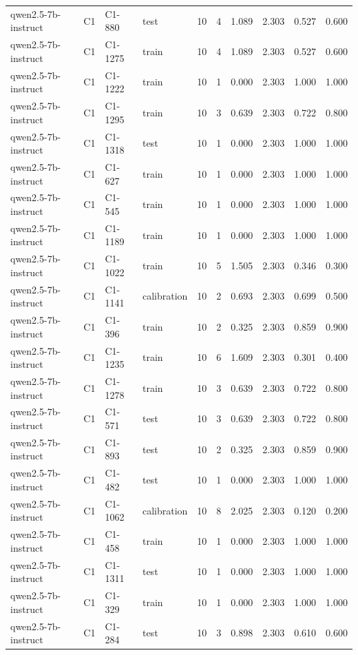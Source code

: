 \begin{table}
\begin{tabular}{llllrrrrrr}
qwen2.5-7b-instruct & C1 & C1-880 & test & 10 & 4 & 1.089 & 2.303 & 0.527 & 0.600 \\
qwen2.5-7b-instruct & C1 & C1-1275 & train & 10 & 4 & 1.089 & 2.303 & 0.527 & 0.600 \\
qwen2.5-7b-instruct & C1 & C1-1222 & train & 10 & 1 & 0.000 & 2.303 & 1.000 & 1.000 \\
qwen2.5-7b-instruct & C1 & C1-1295 & train & 10 & 3 & 0.639 & 2.303 & 0.722 & 0.800 \\
qwen2.5-7b-instruct & C1 & C1-1318 & test & 10 & 1 & 0.000 & 2.303 & 1.000 & 1.000 \\
qwen2.5-7b-instruct & C1 & C1-627 & train & 10 & 1 & 0.000 & 2.303 & 1.000 & 1.000 \\
qwen2.5-7b-instruct & C1 & C1-545 & train & 10 & 1 & 0.000 & 2.303 & 1.000 & 1.000 \\
qwen2.5-7b-instruct & C1 & C1-1189 & train & 10 & 1 & 0.000 & 2.303 & 1.000 & 1.000 \\
qwen2.5-7b-instruct & C1 & C1-1022 & train & 10 & 5 & 1.505 & 2.303 & 0.346 & 0.300 \\
qwen2.5-7b-instruct & C1 & C1-1141 & calibration & 10 & 2 & 0.693 & 2.303 & 0.699 & 0.500 \\
qwen2.5-7b-instruct & C1 & C1-396 & train & 10 & 2 & 0.325 & 2.303 & 0.859 & 0.900 \\
qwen2.5-7b-instruct & C1 & C1-1235 & train & 10 & 6 & 1.609 & 2.303 & 0.301 & 0.400 \\
qwen2.5-7b-instruct & C1 & C1-1278 & train & 10 & 3 & 0.639 & 2.303 & 0.722 & 0.800 \\
qwen2.5-7b-instruct & C1 & C1-571 & test & 10 & 3 & 0.639 & 2.303 & 0.722 & 0.800 \\
qwen2.5-7b-instruct & C1 & C1-893 & test & 10 & 2 & 0.325 & 2.303 & 0.859 & 0.900 \\
qwen2.5-7b-instruct & C1 & C1-482 & test & 10 & 1 & 0.000 & 2.303 & 1.000 & 1.000 \\
qwen2.5-7b-instruct & C1 & C1-1062 & calibration & 10 & 8 & 2.025 & 2.303 & 0.120 & 0.200 \\
qwen2.5-7b-instruct & C1 & C1-458 & train & 10 & 1 & 0.000 & 2.303 & 1.000 & 1.000 \\
qwen2.5-7b-instruct & C1 & C1-1311 & test & 10 & 1 & 0.000 & 2.303 & 1.000 & 1.000 \\
qwen2.5-7b-instruct & C1 & C1-329 & train & 10 & 1 & 0.000 & 2.303 & 1.000 & 1.000 \\
qwen2.5-7b-instruct & C1 & C1-284 & test & 10 & 3 & 0.898 & 2.303 & 0.610 & 0.600 \\

\end{tabular}
\end{table}
